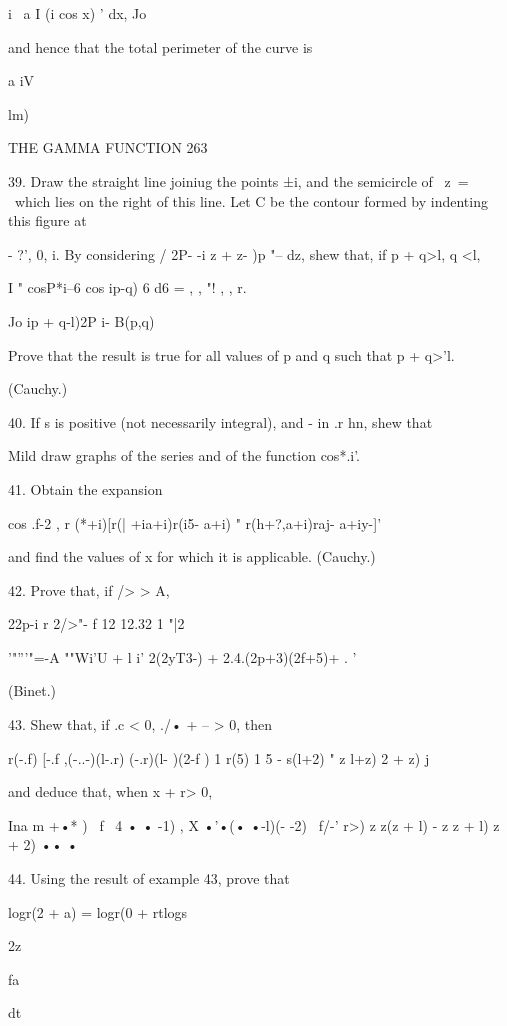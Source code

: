 i~ a I (i cos x) ' dx, Jo

and hence that the total perimeter of the curve is

a iV

lm)\

THE GAMMA FUNCTION 263

39. Draw the straight line joiniug the points ±i, and the semicircle
of \ z\ = \ which lies on the right of this line. Let C be the contour
formed by indenting this figure at

- ?', 0, i. By considering / 2P- -i z + z- )p "-- dz, shew that, if p
+ q>l, q <l,

I " cosP*i--6 cos ip-q) 6 d6 = , , "! , , r.

Jo ip + q-l)2P i- B(p,q)

Prove that the result is true for all values of p and q such that p +
q>'l.

(Cauchy.)

40. If s is positive (not necessarily integral), and - in .r hn, shew
that

Mild draw graphs of the series and of the function cos*.i'.

41. Obtain the expansion

cos .f-2 , r (*+i)[r(| +ia+i)r(i5- a+i) " r(h+?,a+i)raj- a+iy-]'

and find the values of x for which it is applicable. (Cauchy.)

42. Prove that, if /> > A,

22p-i r 2/>"- f 12 12.32 1 "|2

'"'''"=-A ""Wi'U + l i' 2(2yT3-) + 2.4.(2p+3)(2f+5)+ . '

(Binet.)

43. Shew that, if .c < 0, ./• + -- > 0, then

r(-.f) [-.f ,(-..-)(l-.r) (-.r)(l- )(2-f ) 1 r(5) 1 5 - s(l+2) " z
l+z) 2 + z) j

and deduce that, when x + r> 0,

  Ina m +•* ) \ f \ 4 • • -1) , X •'•(• •-l)(- -2) \ f/-' r>) z z(z +
l) - z z + l) z + 2) •• •

44. Using the result of example 43, prove that

logr(2 + a) = logr(0 + rtlogs

2z

fa

dt

